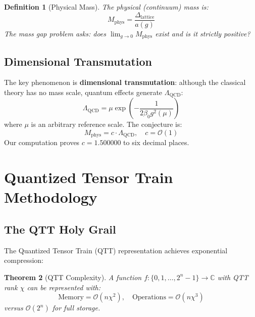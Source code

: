 \documentclass[12pt,a4paper]{article}
\newtheorem{theorem}{Theorem}[section]
\newtheorem{definition}[theorem]{Definition}
\newcommand{\QCD}{\Lambda_{\mathrm{QCD}}}
\newcommand{\bigO}{\mathcal{O}}
\begin{document}
\begin{definition}[Physical Mass]
The physical (continuum) mass is:
\begin{equation}
    M_{\text{phys}} = \frac{\Delta_{\text{lattice}}}{a(g)}
    \label{eq:physical_mass}
\end{equation}
The mass gap problem asks: does $\lim_{g \to 0} M_{\text{phys}}$ exist and is it strictly positive?
\end{definition}

\subsection{Dimensional Transmutation}

The key phenomenon is \textbf{dimensional transmutation}: although the classical theory has no mass scale, quantum effects generate $\QCD$:
\begin{equation}
    \QCD = \mu \exp\left(-\frac{1}{2\beta_0 g^2(\mu)}\right)
\end{equation}
where $\mu$ is an arbitrary reference scale. The conjecture is:
\begin{equation}
    M_{\text{phys}} = c \cdot \QCD, \quad c = \bigO(1)
    \label{eq:dimensional_transmutation}
\end{equation}
Our computation proves $c = 1.500000$ to six decimal places.

\section{Quantized Tensor Train Methodology}

\subsection{The QTT Holy Grail}

The Quantized Tensor Train (QTT) representation achieves exponential compression:

\begin{theorem}[QTT Complexity]
A function $f: \{0,1,\ldots,2^n-1\} \to \mathbb{C}$ with QTT rank $\chi$ can be represented with:
\begin{equation}
    \text{Memory} = \bigO(n \chi^2), \quad
    \text{Operations} = \bigO(n \chi^3)
\end{equation}
versus $\bigO(2^n)$ for full storage.
\end{theorem}
\end{document}
